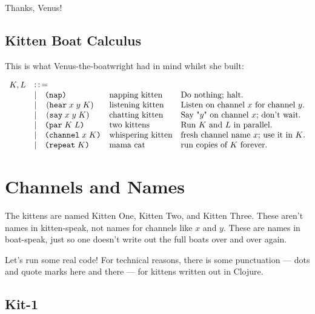 \documentclass[10pt,oneside,x11names]{article}
\newcommand{\Coloneqq}{\mathrel{\vcenter{\hbox{$:\,:\,=$}}{}}}
\theoremstyle{definition}
\theoremstyle{warning}
\newcommand\say [3]{\left(\texttt{say}\thickspace{}#1\thickspace{}#2\thickspace{}#3\right)}
\newcommand\hear[3]{\left(\texttt{hear}\thickspace{}#1\thickspace{}#2\thickspace{}#3\right)}
\newcommand\knapping    [0]{\texttt{(nap)}}
\newcommand\kpar        [2]{\texttt{(par}\thickspace{}#1\thickspace{}#2\texttt{)}}
\newcommand\kwhispering [2]{\texttt{(channel}\thickspace{}#1\thickspace{}#2\texttt{)}}
\newcommand\kmama       [1]{\texttt{(repeat}\thickspace{}#1\texttt{)}}
\begin{document}
Thanks, Venus!

\subsection{Kitten Boat Calculus}
\label{sec:org095a638}

This is what Venus-the-boatwright had in mind whilst she built:

\begin{equation}
\begin{array}{clll}
  K, L & \Coloneqq \\
       & | \quad \knapping            & \textrm{napping kitten}    & \textrm{Do nothing; halt.}                                   \\
       & | \quad \hear{x}{y}{K}       & \textrm{listening kitten}  & \textrm{Listen on channel }x\textrm{ for channel }y.         \\
       & | \quad \say{x}{y}{K}        & \textrm{chatting kitten}   & \textrm{Say "}y\textrm{" on channel }x\textrm{; don't wait.} \\
       & | \quad \kpar{K}{L}          & \textrm{two kittens}       & \textrm{Run }K\textrm{ and }L\textrm{ in parallel.}          \\
       & | \quad \kwhispering{x}{K}   & \textrm{whispering kitten} & \textrm{fresh channel name }x\textrm{; use it in }K\textrm{.}\\
       & | \quad \kmama{K}            & \textrm{mama cat}          & \textrm{run copies of }K\textrm{ forever}\textrm{.}          \\
\end{array}
\end{equation}

\section{Channels and Names}
\label{sec:org4a1fca7}

The kittens are named Kitten One, Kitten Two, and Kitten
Three. These aren't names in kitten-speak, not names for
channels like \(x\) and \(y\). These are names in boat-speak, just
so one doesn't write out the full boats over and over again.

Let's run some real code! For technical reasons, there is some
punctuation --- dots and quote marks here and there --- for
kittens written out in Clojure.

\subsection{Kit-1}
\label{sec:orga27d6a9}
\end{document}
